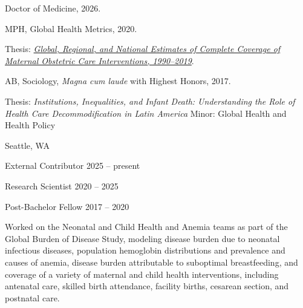 \documentclass[11pt,article,oneside]{memoir}
\begin{document}
\ind Doctor of Medicine, 2026.

\medskip
{}

\ind MPH, Global Health Metrics, 2020.

\ind \hspace{0.35in} \footnotesize Thesis: \href{https://www.proquest.com/openview/e41ccfd9cef6b7376c1218dc0080b575/1?pq-origsite=gscholar&cbl=18750&diss=y}{\emph{Global, Regional, and National Estimates of Complete Coverage of Maternal \newline Obstetric Care
	Interventions, 1990--2019}}.\normalsize 

\medskip
{}

\ind AB, Sociology, \emph{Magna cum laude} with Highest Honors, 2017.

\ind \hspace{0.35in} \footnotesize Thesis: \emph{Institutions, Inequalities, and Infant Death: Understanding the Role of Health Care \newline
Decommodification in Latin America} \newline Minor: Global Health and Health Policy \normalsize \vspace{0.01in}

\bigskip


 \hfill Seattle, WA

\ind External Contributor \hfill 2025 -- present

\ind Research Scientist \hfill 2020 -- 2025

\ind Post-Bachelor Fellow\vspace{0.02in} \hfill 2017 -- 2020

{\noindent \footnotesize Worked on the Neonatal and Child Health and Anemia teams as part of the Global Burden of Disease Study, modeling disease
burden due to neonatal infectious diseases, population hemoglobin distributions and prevalence and causes of anemia, disease burden attributable
to suboptimal breastfeeding, and coverage of a variety of maternal and child health interventions, including antenatal care, skilled birth attendance,
facility births, cesarean section, and postnatal care.} 
\end{document}
